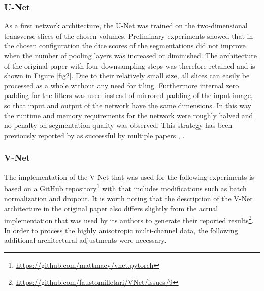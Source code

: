\documentclass[10pt,letterpaper]{article}
\begin{document}
	\subsubsection*{U-Net}
	As a first network architecture, the U-Net \cite{ronneberger2015u} was trained on the two-dimensional transverse slices of the chosen volumes. Preliminary experiments showed that in the chosen configuration the dice scores of the segmentations did not improve when the number of pooling layers was increased or diminished. The architecture of the original paper with four downsampling steps was therefore retained and is shown in Figure \ref{fig2}.
	Due to their relatively small size, all slices can easily be processed as a whole without any need for tiling. Furthermore internal zero padding for the filters was used instead of mirrored padding of the input image, so that input and output of the network have the same dimensions. In this way the runtime and memory requirements for the network were roughly halved and no penalty on segmentation quality was observed. This strategy has been previously reported by as successful by multiple papers \cite{dong2017automatic}, \cite{kayalibay2017cnn}. 
	

		
	\subsubsection*{V-Net}
	The implementation of the V-Net \cite{milletari2016v} that was used for the following experiments is based on a GitHub repository\footnote{\url{https://github.com/mattmacy/vnet.pytorch}} with that includes modifications such as batch normalization and dropout. It is worth noting that the description of the V-Net architecture in the original paper also differs slightly from the actual implementation that was used by its authors to generate their reported results\footnote{\url{https://github.com/faustomilletari/VNet/issues/9}}. In order to process the highly anisotropic multi-channel data, the following additional architectural adjustments were necessary.
	
\end{document}
